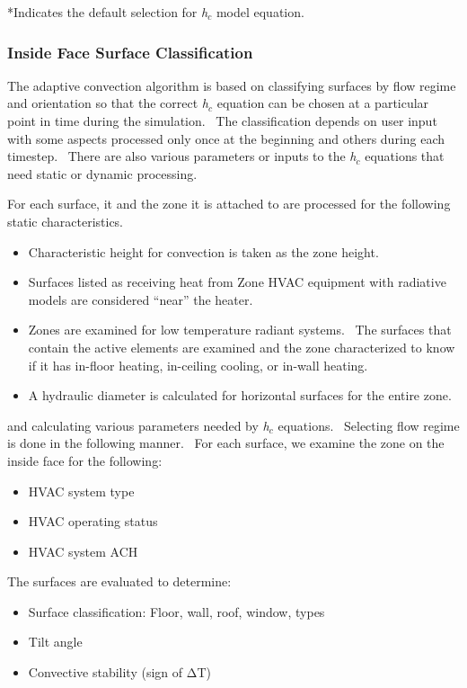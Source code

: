 *Indicates the default selection for \emph{h\(_{c}\)} model equation.

\subsubsection{Inside Face Surface Classification}\label{inside-face-surface-classification}

The adaptive convection algorithm is based on classifying surfaces by flow regime and orientation so that the correct \emph{h\(_{c}\)} equation can be chosen at a particular point in time during the simulation.~ The classification depends on user input with some aspects processed only once at the beginning and others during each timestep.~ There are also various parameters or inputs to the \emph{h\(_{c}\)} equations that need static or dynamic processing.

For each surface, it and the zone it is attached to are processed for the following static characteristics.

\begin{itemize}
\item
  Characteristic height for convection is taken as the zone height.
\item
  Surfaces listed as receiving heat from Zone HVAC equipment with radiative models are considered ``near'' the heater.
\item
  Zones are examined for low temperature radiant systems.~ The surfaces that contain the active elements are examined and the zone characterized to know if it has in-floor heating, in-ceiling cooling, or in-wall heating.
\item
  A hydraulic diameter is calculated for horizontal surfaces for the entire zone.
\end{itemize}

and calculating various parameters needed by \emph{h\(_{c}\)} equations.~ Selecting flow regime is done in the following manner.~ For each surface, we examine the zone on the inside face for the following:

\begin{itemize}
\item
  HVAC system type
\item
  HVAC operating status
\item
  HVAC system ACH
\end{itemize}

The surfaces are evaluated to determine:

\begin{itemize}
\item
  Surface classification: Floor, wall, roof, window, types
\item
  Tilt angle
\item
  Convective stability (sign of ΔT)
\end{itemize}

